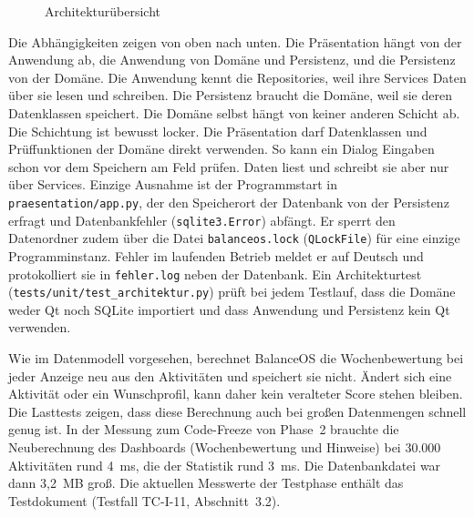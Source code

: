 \begin{figure}[H]
  \caption{Architekturübersicht}\label{abb:architektur}
  \centering
\end{figure}

Die Abhängigkeiten zeigen von oben nach unten. Die Präsentation hängt von der Anwendung ab, die Anwendung von Domäne und Persistenz, und die Persistenz von der Domäne. Die Anwendung kennt die Repositories, weil ihre Services Daten über sie lesen und schreiben. Die Persistenz braucht die Domäne, weil sie deren Datenklassen speichert. Die Domäne selbst hängt von keiner anderen Schicht ab. Die Schichtung ist bewusst locker. Die Präsentation darf Datenklassen und Prüffunktionen der Domäne direkt verwenden. So kann ein Dialog Eingaben schon vor dem Speichern am Feld prüfen. Daten liest und schreibt sie aber nur über Services. Einzige Ausnahme ist der Programmstart in \texttt{praesentation/app.py}, der den Speicherort der Datenbank von der Persistenz erfragt und Datenbankfehler (\texttt{sqlite3.Error}) abfängt. Er sperrt den Datenordner zudem über die Datei \texttt{balanceos.lock} (\texttt{QLockFile}) für eine einzige Programminstanz. Fehler im laufenden Betrieb meldet er auf Deutsch und protokolliert sie in \texttt{fehler.log} neben der Datenbank. Ein Architekturtest (\texttt{tests/unit/test\_architektur.py}) prüft bei jedem Testlauf, dass die Domäne weder Qt noch SQLite importiert und dass Anwendung und Persistenz kein Qt verwenden.

Wie im Datenmodell vorgesehen, berechnet BalanceOS die Wochenbewertung bei jeder Anzeige neu aus den Aktivitäten und speichert sie nicht. Ändert sich eine Aktivität oder ein Wunschprofil, kann daher kein veralteter Score stehen bleiben. Die Lasttests zeigen, dass diese Berechnung auch bei großen Datenmengen schnell genug ist. In der Messung zum Code-Freeze von Phase~2 brauchte die Neuberechnung des Dashboards (Wochenbewertung und Hinweise) bei 30.000 Aktivitäten rund 4~ms, die der Statistik rund 3~ms. Die Datenbankdatei war dann 3,2~MB groß. Die aktuellen Messwerte der Testphase enthält das Testdokument (Testfall TC-I-11, Abschnitt~3.2).

